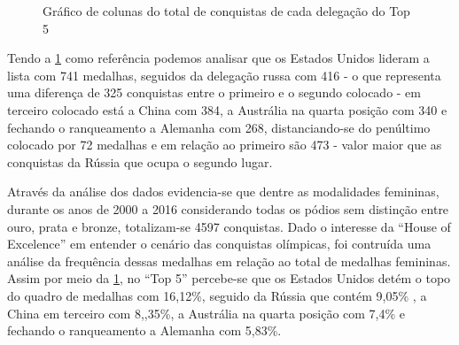 \documentclass[
]{estat/estat}
\begin{document}
\begin{figure}

\caption{\label{fig-prop}Gráfico de colunas do total de conquistas de
cada delegação do Top 5}


\end{figure}%

Tendo a \ref{fig-prop} como referência podemos analisar que os Estados
Unidos lideram a lista com 741 medalhas, seguidos da delegação russa com
416 - o que representa uma diferença de 325 conquistas entre o primeiro
e o segundo colocado - em terceiro colocado está a China com 384, a
Austrália na quarta posição com 340 e fechando o ranqueamento a Alemanha
com 268, distanciando-se do penúltimo colocado por 72 medalhas e em
relação ao primeiro são 473 - valor maior que as conquistas da Rússia
que ocupa o segundo lugar.

Através da análise dos dados evidencia-se que dentre as modalidades
femininas, durante os anos de 2000 a 2016 considerando todas os pódios
sem distinção entre ouro, prata e bronze, totalizam-se 4597 conquistas.
Dado o interesse da ``House of Excelence'' em entender o cenário das
conquistas olímpicas, foi contruída uma análise da frequência dessas
medalhas em relação ao total de medalhas femininas. Assim por meio da
\ref{fig-prop}, no ``Top 5'' percebe-se que os Estados Unidos detém o
topo do quadro de medalhas com 16,12\%, seguido da Rússia que contém
9,05\% , a China em terceiro com 8,,35\%, a Austrália na quarta posição
com 7,4\% e fechando o ranqueamento a Alemanha com 5,83\%.
\end{document}
